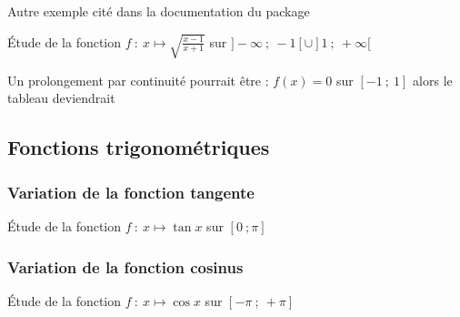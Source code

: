 Autre exemple  cité dans la documentation du package 

Étude de la fonction $f~:~ x \longmapsto \sqrt{\frac{x-1}{x+1}}$ sur $]-\infty~;~-1[\cup ]1~;~+\infty[$

\begin{tkzexample} 
\end{tkzexample}  

Un prolongement par continuité pourrait être : $f(x)=0$ sur $[-1~;~1]$ alors le tableau deviendrait

\begin{tkzexample} 
\end{tkzexample}  


\subsection{Fonctions trigonométriques}
 \subsubsection{Variation de la fonction tangente}
 Étude de la fonction $f~:~ x \longmapsto \tan{x}$ sur $[0~;\pi]$
 
 \begin{tkzexample}[vbox]
\end{tkzexample}  

\subsubsection{Variation de la fonction cosinus}
  Étude de la fonction $f~:~ x \longmapsto \cos{x}$ sur $[-\pi~;~+\pi]$
  
